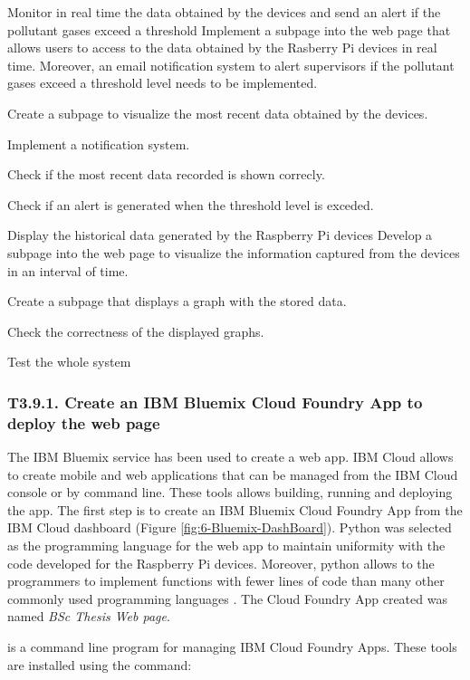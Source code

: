 {Monitor in real time the data obtained by the devices and send an alert if the pollutant gases exceed a threshold}
{Implement a subpage into the web page that allows users to access to the data obtained by the Rasberry Pi devices in real time. Moreover, an email notification system to alert supervisors if the pollutant gases exceed a threshold level needs to be implemented.}
{	\item Create a subpage to visualize the most recent data obtained by the devices.
	\item Implement a notification system.
}{	\item Check if the most recent data recorded is shown correcly.
	\item Check if an alert is generated when the threshold level is exceded.
}

{Display the historical data generated by the Raspberry Pi devices}
{Develop a subpage into the web page to visualize the information captured from the devices in an interval of time.}
{	\item Create a subpage that displays a graph with the stored data.
}{	\item Check the correctness of the displayed graphs.
	\item Test the whole system
}


\subsubsection{T3.9.1. Create an IBM Bluemix Cloud Foundry App to deploy the web page}
The IBM Bluemix service has been used to create a web app. IBM Cloud allows to create mobile and web applications that can be managed from the IBM Cloud console or by command line. These tools allows building, running and deploying the app. The first step is to create an IBM Bluemix Cloud Foundry App from the IBM Cloud dashboard (Figure \ref{fig:6-Bluemix-DashBoard}). Python was selected as the programming language for the web app to maintain uniformity with the code developed for the Raspberry Pi devices. Moreover, python allows to the programmers to implement functions with fewer lines of code than many other commonly used programming languages \cite{Pre00}. The Cloud Foundry App created was named \textit{BSc Thesis Web page}.

 is a command line program for managing IBM Cloud Foundry Apps. These tools are installed using the command:


